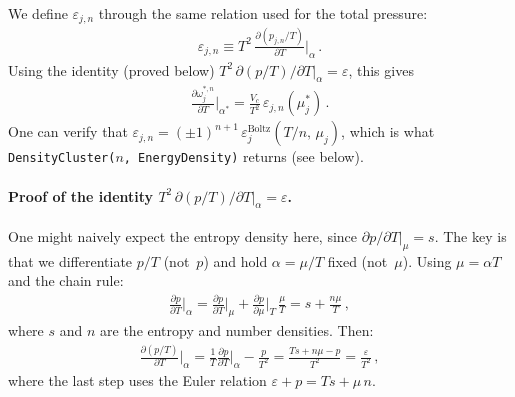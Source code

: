 \documentclass[11pt]{article}
\begin{document}
We define $\varepsilon_{j,n}$ through the same relation used for the total pressure:
\begin{align}
  \varepsilon_{j,n} \equiv T^2\,\frac{\partial(p_{j,n}/T)}{\partial T}\bigg|_{\alpha} \,.
  \label{eq:epsjn_def}
\end{align}
Using the identity (proved below) $T^2\,\partial(p/T)/\partial T\big|_\alpha = \varepsilon$, this gives
\begin{align}
  \frac{\partial\omega_j^{*,n}}{\partial T}\bigg|_{\alpha^*}
  = \frac{V_c}{T^2}\,\varepsilon_{j,n}(\mu_j^*) \,.
  \label{eq:domega_dT}
\end{align}
One can verify that $\varepsilon_{j,n} = (\pm 1)^{n+1}\,\varepsilon_j^{\mathrm{Boltz}}(T/n,\,\mu_j)$, which is what \texttt{DensityCluster($n$, EnergyDensity)} returns (see below).

\paragraph{Proof of the identity $T^2\,\partial(p/T)/\partial T\big|_\alpha = \varepsilon$.}
One might naively expect the entropy density here, since $\partial p/\partial T|_\mu = s$.
The key is that we differentiate $p/T$ (not~$p$) and hold $\alpha = \mu/T$ fixed (not~$\mu$).
Using $\mu = \alpha T$ and the chain rule:
\begin{align}
  \frac{\partial p}{\partial T}\bigg|_{\alpha}
  = \frac{\partial p}{\partial T}\bigg|_{\mu} + \frac{\partial p}{\partial \mu}\bigg|_{T}\,\frac{\mu}{T}
  = s + \frac{n\mu}{T} \,,
\end{align}
where $s$ and $n$ are the entropy and number densities.
Then:
\begin{align}
  \frac{\partial(p/T)}{\partial T}\bigg|_{\alpha}
  = \frac{1}{T}\frac{\partial p}{\partial T}\bigg|_{\alpha} - \frac{p}{T^2}
  = \frac{Ts + n\mu - p}{T^2}
  = \frac{\varepsilon}{T^2} \,,
  \label{eq:dpoverTdT}
\end{align}
where the last step uses the Euler relation $\varepsilon + p = Ts + \mu\,n$.
\end{document}
